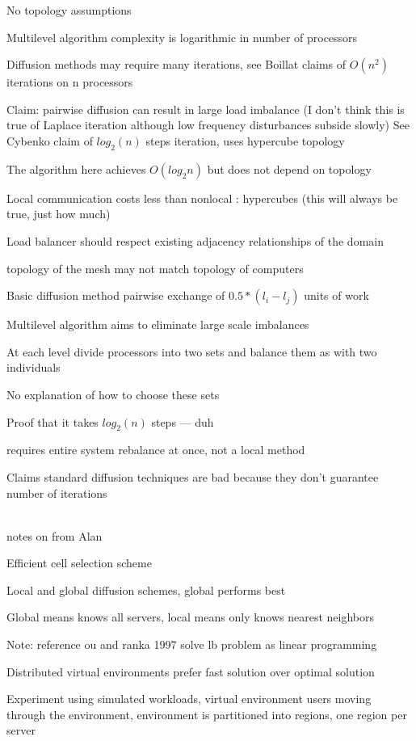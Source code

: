 \documentclass{article}
\begin{document}
No topology assumptions

Multilevel algorithm complexity is logarithmic in number of processors

Diffusion methods may require many iterations, see Boillat claims of $O(n^2)$ iterations on n processors

Claim: pairwise diffusion can result in large load imbalance (I don’t think this is true of Laplace iteration although low frequency disturbances subside slowly)
See Cybenko claim of $log_2(n)$ steps iteration, uses hypercube topology

The algorithm here achieves $O(log_2 n)$ but does not depend on topology

Local communication costs less than nonlocal : hypercubes (this will always be true, just how much)

Load balancer should respect existing adjacency relationships of the domain

topology of the mesh may not match topology of computers

Basic diffusion method pairwise exchange of $0.5*(l_i - l_j)$ units of work

Multilevel algorithm aims to eliminate large scale imbalances

At each level divide processors into two sets and balance them as with two individuals

No explanation of how to choose these sets

Proof that it takes $log_2(n)$ steps — duh

requires entire system rebalance at once, not a local method

Claims standard diffusion techniques are bad because they don’t guarantee number of iterations




\cite{Deng:2010:HDB:1889863.1889910}\\

notes on
\cite{Deng:2010:HDB:1889863.1889910}
from Alan

Efficient cell selection scheme

Local and global diffusion schemes, global performs best

Global means knows all servers, local means only knows nearest neighbors

Note: reference ou and ranka 1997 solve lb problem as linear programming

Distributed virtual environments prefer fast solution over optimal solution

Experiment using simulated workloads, virtual environment users moving through the environment, environment is partitioned into regions, one region per server
\end{document}
